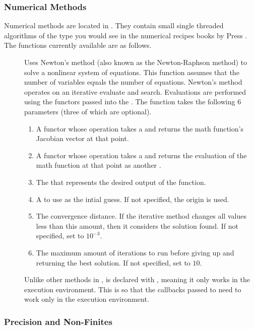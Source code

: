 \subsubsection{Numerical Methods}

Numerical methods are located in . They
contain small single threaded algorithms of the type you would see in the
numerical recipes books by Press \etal{}. The functions
currently available are as follows.

\begin{description}
\item[] Uses Newton's method (also known as the
  Newton-Raphson method) to solve a nonlinear system of equations. This
  function assumes that the number of variables equals the number of
  equations. Newton's method operates on an iterative evaluate and
  search. Evaluations are performed using the functors passed into the
  . The function takes the following 6
  parameters (three of which are optional).
  \begin{enumerate}
  \item A functor whose operation takes a  and returns the
    math function's Jacobian vector at that point.
  \item A functor whose operation takes a  and returns the
    evaluation of the math function at that point as another .
  \item The  that represents the desired output of the function.
  \item A  to use as the intial guess. If not specified, the
    origin is used.
  \item The convergence distance. If the iterative method changes all
    values less than this amount, then it considers the solution found. If
    not specified, set to $10^{-3}$.
  \item The maximum amount of iterations to run before giving up and
    returning the best solution. If not specified, set to $10$.
  \end{enumerate}
  Unlike other methods in \daxmath{},  is
  declared with , meaning it only works in the
  execution environment. This is so that the callbacks passed to
   need to work only in the execution
  environment.
\end{description}

\subsubsection{Precision and Non-Finites}

